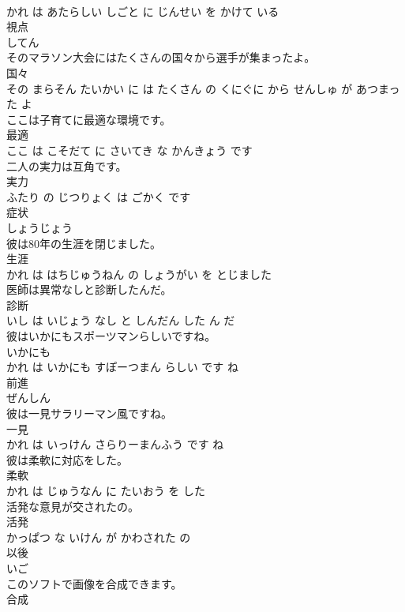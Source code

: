 \documentclass[8pt]{extreport}
\begin{document}
\begin{CJK}{UTF8}{min}
\\	かれ は あたらしい しごと に じんせい を かけて いる			
\\	視点	
\\	してん		
\\	そのマラソン大会にはたくさんの国々から選手が集まったよ。	
\\	国々 
\\	その まらそん たいかい に は たくさん の くにぐに から せんしゅ が あつまった よ			
\\	ここは子育てに最適な環境です。	
\\	最適 
\\	ここ は こそだて に さいてき な かんきょう です			
\\	二人の実力は互角です。	
\\	実力 
\\	ふたり の じつりょく は ごかく です			
\\	症状	
\\	しょうじょう		
\\	彼は80年の生涯を閉じました。	
\\	生涯 
\\	かれ は はちじゅうねん の しょうがい を とじました			
\\	医師は異常なしと診断したんだ。	
\\	診断 
\\	いし は いじょう なし と しんだん した ん だ			
\\	彼はいかにもスポーツマンらしいですね。	
\\	いかにも 
\\	かれ は いかにも すぽーつまん らしい です ね			
\\	前進	
\\	ぜんしん		
\\	彼は一見サラリーマン風ですね。	
\\	一見 
\\	かれ は いっけん さらりーまんふう です ね			
\\	彼は柔軟に対応をした。	
\\	柔軟 
\\	かれ は じゅうなん に たいおう を した			
\\	活発な意見が交されたの。	
\\	活発 
\\	かっぱつ な いけん が かわされた の			
\\	以後	
\\	いご		
\\	このソフトで画像を合成できます。	
\\	合成 

\end{CJK}
\end{document}
